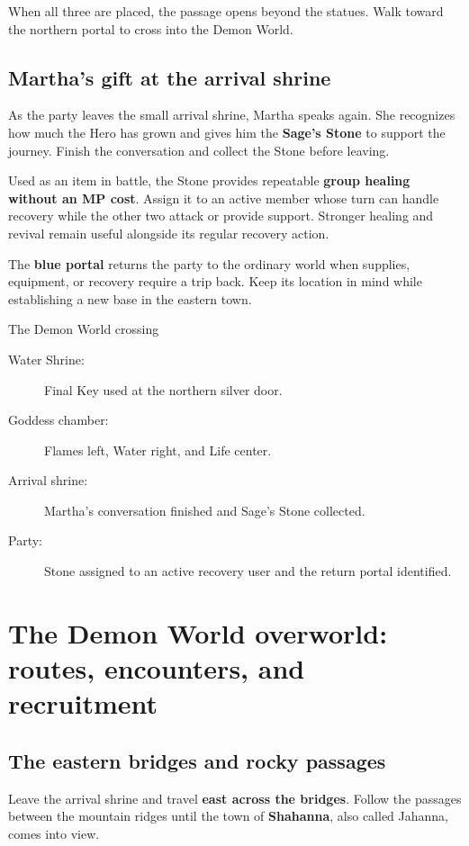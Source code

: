 When all three are placed, the passage opens beyond the
statues. Walk toward the northern portal to cross into
the Demon World.

\subsection*{Martha's gift at the arrival shrine}

As the party leaves the small arrival shrine, Martha speaks
again. She recognizes how much the Hero has grown and gives
him the \textbf{Sage's Stone} to support the journey.
Finish the conversation and collect the Stone before leaving.

Used as an item in battle, the Stone provides repeatable
\textbf{group healing without an MP cost}. Assign it to an
active member whose turn can handle recovery while the other
two attack or provide support. Stronger healing and revival
remain useful alongside its regular recovery action.

The \textbf{blue portal} returns the party to the ordinary
world when supplies, equipment, or recovery require a trip
back. Keep its location in mind while establishing a new
base in the eastern town.

\begin{routecheck}{The Demon World crossing}
\begin{description}
  \item[Water Shrine:] Final Key used at the northern silver door.
  \item[Goddess chamber:] Flames left, Water right, and Life center.
  \item[Arrival shrine:] Martha's conversation finished and
    Sage's Stone collected.
  \item[Party:] Stone assigned to an active recovery user and
    the return portal identified.
\end{description}
\end{routecheck}

\section{The Demon World overworld: routes, encounters, and recruitment}

\subsection*{The eastern bridges and rocky passages}

Leave the arrival shrine and travel \textbf{east across the bridges}.
Follow the passages between the mountain ridges until the town of
\textbf{Shahanna}, also called Jahanna, comes into view.

